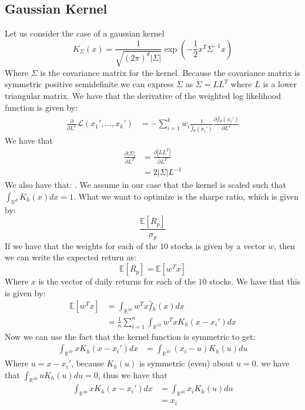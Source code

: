 \documentclass[12pt]{article}
\begin{document}
\subsection*{Gaussian Kernel}
Let us consider the case of a gaussian kernel 
$$K_{\Sigma}(x) = \frac{1}{\sqrt{(2\pi)^d|\Sigma|}}\exp\left(-\frac{1}{2}x^T\Sigma^{-1}x\right)$$
Where $\Sigma$ is the covariance matrix for the kernel. Because the 
covariance matrix is symmetric positive semidefinite 
we can express $\Sigma$ as $\Sigma = LL^T$ where $L$ is a lower triangular matrix.
We have that the derivative of the 
weighted log likelihood function is given by:
\begin{align*}
    \frac{\partial}{\partial L^T}\mathcal{L}(x_1',\dots,x_k') &= -\sum_{i=1}^k w_i \frac{1}{\hat{f}_{\theta}(x_i')} \frac{\partial \hat{f}_{\theta}(x_i')}{\partial L^T}
\end{align*}
We have that 
\begin{align*}
    \frac{\partial |\Sigma|}{\partial L^T} &= \frac{\partial |LL^T|}{\partial L^T} \\
    &= 2|\Sigma|L^{-1}
\end{align*}
We also have that:
. We assume 
in our  case that the kernel is scaled such that $\int_{\mathbb{R}^d} K_h(x) dx = 1$. What we want to optimize is the sharpe 
ratio, which is given by: 
\begin{equation}
    \frac{\mathbb{E}[R_p]}{\sigma_p}
\end{equation}
If we have that the weights for each of the $10$ stocks is given by a vector $w$, then we can write the expected return as:
\begin{equation}
    \mathbb{E}[R_p] = \mathbb{E}[w^T x]
\end{equation}
Where $x$ is the vector of daily returns for each of the $10$ stocks. We have that this is given by:
\begin{align}
    \mathbb{E}[w^T x] &= \int_{\mathbb{R}^{10}} w^T x \hat{f}_h(x) dx \\
    &= \frac{1}{n} \sum_{i=1}^n\int_{\mathbb{R}^{10}} w^T xK_h(x-x_i') dx
\end{align}
Now we can use the fact that the kernel function is symmetric to get:
\begin{align*}
    \int_{\mathbb{R}^{10}} xK_h(x-x_i') dx & = \int_{\mathbb{R}^{10}} (x_i-u)K_h(u) du 
\end{align*}
Where $u=x-x_i'$, because $K_h(u)$ is symmetric (even) about $u=0$. we have that $\int_{\mathbb{R}^{10}}uK_h(u) du = 0$, thus we have that 
\begin{align}
    \int_{\mathbb{R}^{10}} xK_h(x-x_i') dx & = \int_{\mathbb{R}^{10}}x_iK_h(u) du \\
    &= x_i
\end{align}
\end{document}
